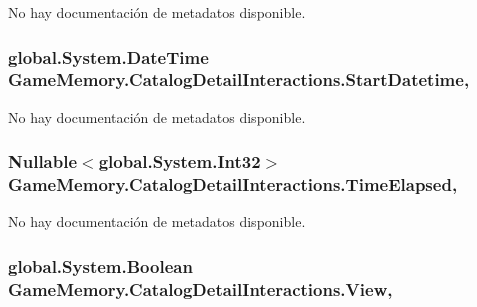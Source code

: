 No hay documentación de metadatos disponible. 

\hypertarget{class_game_memory_1_1_catalog_detail_interactions_a39bb069512ca0a6abdf9df3d0aa54cf0}{
\subsubsection[{Start\-Datetime}]{\setlength{\rightskip}{0pt plus 5cm}global.\-System.\-Date\-Time Game\-Memory.\-Catalog\-Detail\-Interactions.\-Start\-Datetime\hspace{0.3cm}{\ttfamily [get]}, {\ttfamily [set]}}}\label{class_game_memory_1_1_catalog_detail_interactions_a39bb069512ca0a6abdf9df3d0aa54cf0}


No hay documentación de metadatos disponible. 

\hypertarget{class_game_memory_1_1_catalog_detail_interactions_abf1ec4f566957f8c8d8d70a6f3f775e6}{
\subsubsection[{Time\-Elapsed}]{\setlength{\rightskip}{0pt plus 5cm}Nullable$<$global.\-System.\-Int32$>$ Game\-Memory.\-Catalog\-Detail\-Interactions.\-Time\-Elapsed\hspace{0.3cm}{\ttfamily [get]}, {\ttfamily [set]}}}\label{class_game_memory_1_1_catalog_detail_interactions_abf1ec4f566957f8c8d8d70a6f3f775e6}


No hay documentación de metadatos disponible. 

\hypertarget{class_game_memory_1_1_catalog_detail_interactions_aa1066cee4581a0ec9f0169f6336d75b8}{
\subsubsection[{View}]{\setlength{\rightskip}{0pt plus 5cm}global.\-System.\-Boolean Game\-Memory.\-Catalog\-Detail\-Interactions.\-View\hspace{0.3cm}{\ttfamily [get]}, {\ttfamily [set]}}}\label{class_game_memory_1_1_catalog_detail_interactions_aa1066cee4581a0ec9f0169f6336d75b8}


